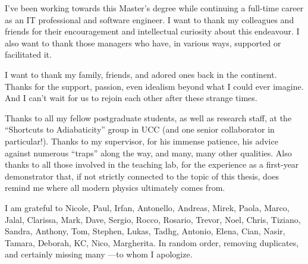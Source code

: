 I've been working towards this Master's degree 
while continuing a full-time career as an IT professional and software engineer. 
I want to thank my colleagues and friends 
for their encouragement and intellectual curiosity about this endeavour. 
I also want to thank those managers who have, 
in various ways, 
supported or facilitated it.

I want to thank my family, friends, and adored ones back in the continent. 
Thanks for the support, passion, even idealism beyond what I could ever imagine. 
And I can’t wait for us to rejoin each other after these strange times.

Thanks to all my fellow postgraduate students, as well as research staff, at the
“Shortcuts to Adiabaticity” group in UCC (and one senior collaborator in particular!). 
Thanks to my supervisor, for his immense patience, his advice against numerous “traps” along the way, 
and many, many other qualities. 
Also thanks to all those involved in the teaching lab, 
for the experience as a first-year demonstrator that, 
if not strictly connected to the topic of this thesis, 
does remind me where all modern physics ultimately comes from.

I am grateful to Nicole, Paul, Irfan, Antonello, Andreas, Mirek, Paola, Marco,
Jalal, Clarissa, Mark, Dave, Sergio, Rocco, Rosario, Trevor, Noel, Chris, Tiziano,
Sandra, Anthony, Tom, Stephen, Lukas, Tadhg, Antonio, Elena, Cian, Nasir, Tamara, 
Deborah, KC, Nico, Margherita. 
In random order, removing duplicates, and certainly missing many ---to whom I apologize.
